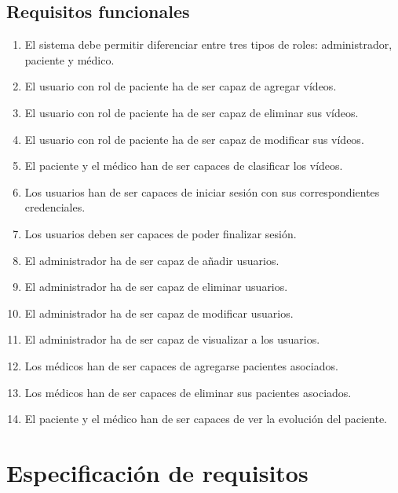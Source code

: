 \subsection{Requisitos funcionales}
\begin{enumerate}[label=\textbf{RF\arabic*:}, left=0pt, itemindent=1.5em]

\item El sistema debe permitir diferenciar entre tres tipos de roles: administrador, paciente y médico.
\item El usuario con rol de paciente ha de ser capaz de agregar vídeos.
\item El usuario con rol de paciente ha de ser capaz de eliminar sus vídeos.
\item El usuario con rol de paciente ha de ser capaz de modificar sus vídeos.
\item El paciente y el médico han de ser capaces de clasificar los vídeos.
\item Los usuarios han de ser capaces de iniciar sesión con sus correspondientes credenciales.
\item Los usuarios deben ser capaces de poder finalizar sesión.
\item El administrador ha de ser capaz de añadir usuarios.
\item El administrador ha de ser capaz de eliminar usuarios.
\item El administrador ha de ser capaz de modificar usuarios.
\item El administrador ha de ser capaz de visualizar a los usuarios.
\item Los médicos han de ser capaces de agregarse pacientes asociados.
\item Los médicos han de ser capaces de eliminar sus pacientes asociados.
\item El paciente y el médico han de ser capaces de ver la evolución del paciente.

\end{enumerate}

\section{Especificación de requisitos}

